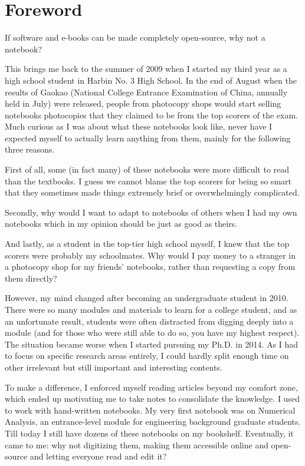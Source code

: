 \chapter*{Foreword}

If software and e-books can be made completely open-source, why not a notebook?

This brings me back to the summer of 2009 when I started my third year as a high school student in Harbin No. 3 High School. In the end of August when the results of Gaokao (National College Entrance Examination of China, annually held in July) were released, people from photocopy shops would start selling notebooks photocopies that they claimed to be from the top scorers of the exam. Much curious as I was about what these notebooks look like, never have I expected myself to actually learn anything from them, mainly for the following three reasons.

First of all, some (in fact many) of these notebooks were more difficult to read than the textbooks. I guess we cannot blame the top scorers for being so smart that they sometimes made things extremely brief or overwhelmingly complicated.

Secondly, why would I want to adapt to notebooks of others when I had my own notebooks which in my opinion should be just as good as theirs.

And lastly, as a student in the top-tier high school myself, I knew that the top scorers were probably my schoolmates. Why would I pay money to a stranger in a photocopy shop for my friends' notebooks, rather than requesting a copy from them directly?

However, my mind changed after becoming an undergraduate student in 2010. There were so many modules and materials to learn for a college student, and as an unfortunate result, students were often distracted from digging deeply into a module (and for those who were still able to do so, you have my highest respect). The situation became worse when I started pursuing my Ph.D. in 2014. As I had to focus on specific research areas entirely, I could hardly split enough time on other irrelevant but still important and interesting contents.

To make a difference, I enforced myself reading articles beyond my comfort zone, which ended up motivating me to take notes to consolidate the knowledge. I used to work with hand-written notebooks. My very first notebook was on Numerical Analysis, an entrance-level module for engineering background graduate students. Till today I still have dozens of these notebooks on my bookshelf. Eventually, it came to me: why not digitizing them, making them accessible online and open-source and letting everyone read and edit it?

